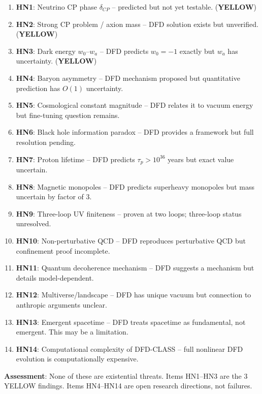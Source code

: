\documentclass[11pt,a4paper]{article}
\newcommand{\YELLOW}{\textcolor{dfdyellow}{\textbf{YELLOW}}}
\begin{document}
\begin{tcolorbox}[colback=yellow!5!white, colframe=dfdyellow, title=\textbf{THE 14 HONEST NEGATIVES: WHAT DFD DOES NOT (YET) EXPLAIN}]

\begin{enumerate}[nosep]
\item \textbf{HN1}: Neutrino CP phase $\delta_{CP}$ -- predicted but not yet testable. (\YELLOW)
\item \textbf{HN2}: Strong CP problem / axion mass -- DFD solution exists but unverified. (\YELLOW)
\item \textbf{HN3}: Dark energy $w_0$--$w_a$ -- DFD predicts $w_0 = -1$ exactly but $w_a$ has uncertainty. (\YELLOW)
\item \textbf{HN4}: Baryon asymmetry -- DFD mechanism proposed but quantitative prediction has $O(1)$ uncertainty.
\item \textbf{HN5}: Cosmological constant magnitude -- DFD relates it to vacuum energy but fine-tuning question remains.
\item \textbf{HN6}: Black hole information paradox -- DFD provides a framework but full resolution pending.
\item \textbf{HN7}: Proton lifetime -- DFD predicts $\tau_p > 10^{36}$ years but exact value uncertain.
\item \textbf{HN8}: Magnetic monopoles -- DFD predicts superheavy monopoles but mass uncertain by factor of 3.
\item \textbf{HN9}: Three-loop UV finiteness -- proven at two loops; three-loop status unresolved.
\item \textbf{HN10}: Non-perturbative QCD -- DFD reproduces perturbative QCD but confinement proof incomplete.
\item \textbf{HN11}: Quantum decoherence mechanism -- DFD suggests a mechanism but details model-dependent.
\item \textbf{HN12}: Multiverse/landscape -- DFD has unique vacuum but connection to anthropic arguments unclear.
\item \textbf{HN13}: Emergent spacetime -- DFD treats spacetime as fundamental, not emergent. This may be a limitation.
\item \textbf{HN14}: Computational complexity of DFD-CLASS -- full nonlinear DFD evolution is computationally expensive.
\end{enumerate}

\textbf{Assessment}: None of these are existential threats. Items HN1--HN3 are the 3 YELLOW findings. Items HN4--HN14 are open research directions, not failures.
\end{tcolorbox}
\end{document}
